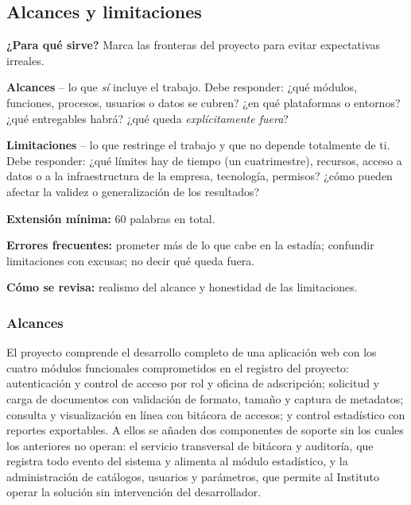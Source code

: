 \subsection{Alcances y limitaciones} \label{sec:alcances_limitaciones} %

\begin{guia}
\textbf{¿Para qué sirve?} Marca las fronteras del proyecto para evitar expectativas irreales.

\textbf{Alcances} -- lo que \emph{sí} incluye el trabajo. Debe responder: ¿qué módulos, funciones, procesos, usuarios o
datos se cubren? ¿en qué plataformas o entornos? ¿qué entregables habrá? ¿qué queda \emph{explícitamente fuera}?

\textbf{Limitaciones} -- lo que restringe el trabajo y que no depende totalmente de ti. Debe responder: ¿qué límites hay
de tiempo (un cuatrimestre), recursos, acceso a datos o a la infraestructura de la empresa, tecnología, permisos?
¿cómo pueden afectar la validez o generalización de los resultados?

\textbf{Extensión mínima:} 60 palabras en total.

\textbf{Errores frecuentes:} prometer más de lo que cabe en la estadía; confundir limitaciones con excusas; no decir qué
queda fuera.

\textbf{Cómo se revisa:} realismo del alcance y honestidad de las limitaciones.
\end{guia}

\subsubsection{Alcances} \label{subsec:alcances}

El proyecto comprende el desarrollo completo de una aplicación web con los cuatro módulos funcionales comprometidos en el registro del proyecto: autenticación y control de acceso por rol y oficina de adscripción; solicitud y carga de documentos con validación de formato, tamaño y captura de metadatos; consulta y visualización en línea con bitácora de accesos; y control estadístico con reportes exportables. A ellos se añaden dos componentes de soporte sin los cuales los anteriores no operan: el servicio transversal de bitácora y auditoría, que registra todo evento del sistema y alimenta al módulo estadístico, y la administración de catálogos, usuarios y parámetros, que permite al Instituto operar la solución sin intervención del desarrollador.

